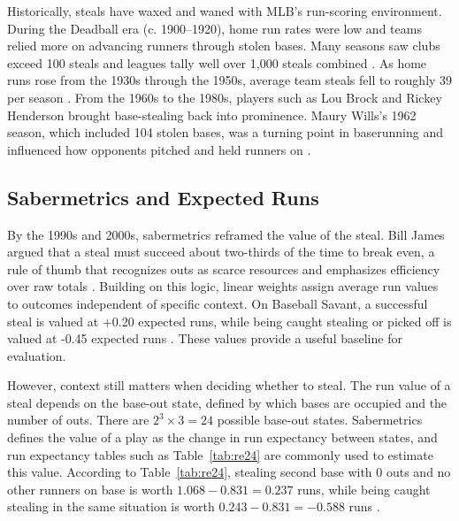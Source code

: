 \documentclass[12pt,letterpaper]{article}
\begin{document}
Historically, steals have waxed and waned with MLB's run-scoring environment. During the Deadball era (c. 1900--1920), home run rates were low and teams relied more on advancing runners through stolen bases. Many seasons saw clubs exceed 100 steals and leagues tally well over 1,000 steals combined \citep{McMurray2015Deadball}. As home runs rose from the 1930s through the 1950s, average team steals fell to roughly 39 per season \citep{BaseballReference1950}. From the 1960s to the 1980s, players such as Lou Brock and Rickey Henderson brought base-stealing back into prominence. Maury Wills's 1962 season, which included 104 stolen bases, was a turning point in baserunning and influenced how opponents pitched and held runners on \citep{Vazzana2016MauryWills}.

\subsection{Sabermetrics and Expected Runs}

By the 1990s and 2000s, sabermetrics reframed the value of the steal. Bill James argued that a steal must succeed about two-thirds of the time to break even, a rule of thumb that recognizes outs as scarce resources and emphasizes efficiency over raw totals \citep{James2023Baserunning}. Building on this logic, linear weights assign average run values to outcomes independent of specific context. On Baseball Savant, a successful steal is valued at +0.20 expected runs, while being caught stealing or picked off is valued at -0.45 expected runs \citep{BaseballSavantRunValueND}. These values provide a useful baseline for evaluation.

However, context still matters when deciding whether to steal. The run value of a steal depends on the base-out state, defined by which bases are occupied and the number of outs. There are $2^3 \times 3 = 24$ possible base-out states. Sabermetrics defines the value of a play as the change in run expectancy between states, and run expectancy tables such as Table~\ref{tab:re24} are commonly used to estimate this value. According to Table~\ref{tab:re24}, stealing second base with 0 outs and no other runners on base is worth $1.068 - 0.831 = 0.237$ runs, while being caught stealing in the same situation is worth $0.243 - 0.831 = -0.588$ runs \citep{FanGraphsRE24ND}.
\end{document}
